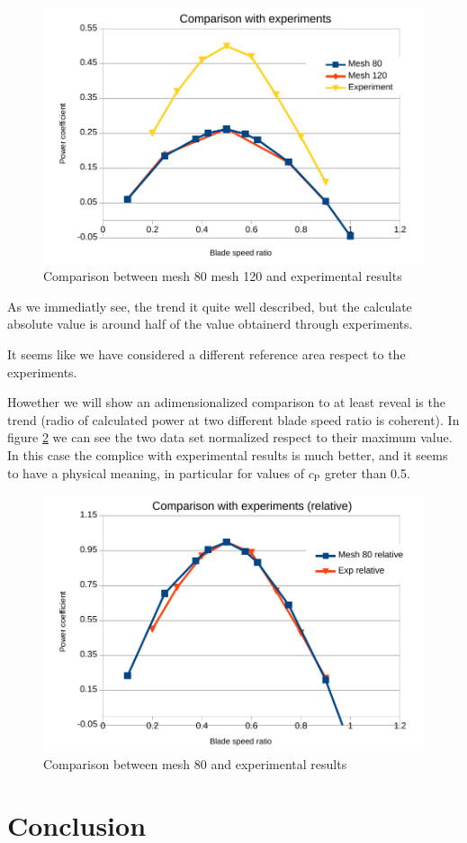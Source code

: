\documentclass[a4paper,12pt]{article}
\begin{document}
\begin{figure}[hbtp]
\centering
\includegraphics[width=15cm]{images/bsr/bsr-exp.pdf}
\caption{Comparison between mesh 80 mesh 120 and experimental results}
\label{fig:bsr-comparison-exp}
\end{figure}

As we immediatly see, the trend it quite well described, but the calculate absolute value is around half of the value obtainerd through experiments.

It seems like we have considered a different reference area respect to the experiments.

Howether we will show an adimensionalized comparison to at least reveal is the trend (radio of calculated power at two different blade speed ratio is coherent).
In figure \ref{fig:bsr-comparison-exp-relative} we can see the two data set normalized respect to their maximum value.
In this case the complice with experimental results is much better, and it seems to have a physical meaning, in particular for values of $c_\text{P}$ greter than 0.5.

\begin{figure}[hbtp]
\centering
\includegraphics[width=15cm]{images/bsr/bsr-exp-relative.pdf}
\caption{Comparison between mesh 80 and experimental results}
\label{fig:bsr-comparison-exp-relative}
\end{figure}

\section{Conclusion}
\end{document}
